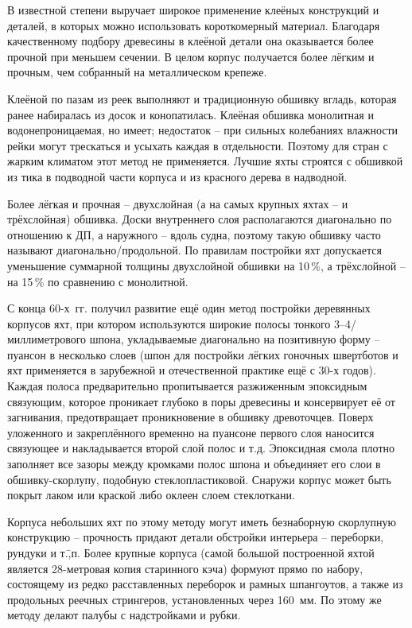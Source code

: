 В известной степени выручает широкое применение клеёных конструкций и деталей, в которых можно использовать короткомерный материал. Благодаря качественному подбору древесины в клеёной детали она оказывается более прочной при меньшем сечении. В целом корпус получается более лёгким и прочным, чем собранный на металлическом крепеже.

Клеёной по пазам из реек выполняют и традиционную обшивку вгладь, которая ранее набиралась из досок и конопатилась. Клеёная обшивка монолитная и водонепроницаемая, но имеет; недостаток \--- при сильных колебаниях влажности рейки могут трескаться и усыхать каждая в отдельности. Поэтому для стран с жарким климатом этот метод не применяется. Лучшие яхты строятся с обшивкой из тика в подводной части корпуса и из красного дерева в надводной.

Более лёгкая и прочная \--- двухслойная (а на самых крупных яхтах \--- и трёхслойная) обшивка. Доски внутреннего слоя располагаются диагонально по отношению к ДП, а наружного \--- вдоль судна, поэтому такую обшивку часто называют диагонально\-/продольной. По правилам постройки яхт допускается уменьшение суммарной толщины двухслойной обшивки на 10\,\%, а трёхслойной \--- на 15\,\% по сравнению с монолитной. 

С конца 60-х~гг. получил развитие ещё один метод постройки деревянных корпусов яхт, при котором используются широкие полосы тонкого 3--4\-/миллиметрового шпона, укладываемые диагонально на позитивную форму \--- пуансон в несколько слоев (шпон для постройки лёгких гоночных швертботов и яхт применяется в зарубежной и отечественной практике ещё с 30-х годов). Каждая полоса предварительно пропитывается разжиженным эпоксидным связующим, которое проникает глубоко в поры древесины и консервирует её от загнивания, предотвращает проникновение в обшивку древоточцев. Поверх уложенного и закреплённого временно на пуансоне первого слоя наносится связующее и накладывается второй слой полос и т.д. Эпоксидная смола плотно заполняет все зазоры между кромками полос шпона и объединяет его слои в обшивку-скорлупу, подобную стеклопластиковой. Снаружи корпус может быть покрыт лаком или краской либо оклеен слоем стеклоткани. 

Корпуса небольших яхт по этому методу могут иметь безнаборную скорлупную конструкцию \--- прочность придают детали обстройки интерьера \--- переборки, рундуки и т.\=,п. Более крупные корпуса (самой большой построенной яхтой является 28-метровая копия старинного кэча) формуют прямо по набору, состоящему из редко расставленных переборок и рамных шпангоутов, а также из продольных реечных стрингеров, установленных через 160~мм. По этому же методу делают палубы с надстройками и рубки.

